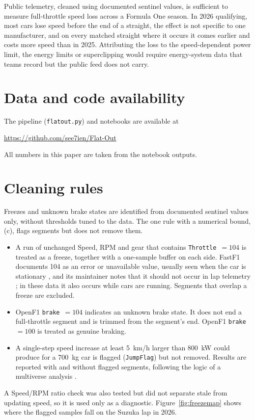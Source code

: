 \documentclass[11pt,a4paper]{article}
\newcommand{\var}[1]{\texttt{#1}}
\begin{document}
Public telemetry, cleaned using documented sentinel values, is sufficient to measure full-throttle speed loss across a Formula One season. In 2026 qualifying, most cars lose speed before the end of a straight, the effect is not specific to one manufacturer, and on every matched straight where it occurs it comes earlier and costs more speed than in 2025. Attributing the loss to the speed-dependent power limit, the energy limits or superclipping would require energy-system data that teams record but the public feed does not carry.

\section*{Data and code availability}
The pipeline (\texttt{flatout.py}) and notebooks are available at
\begin{center}
  \url{https://github.com/see7ien/Flat-Out}
\end{center}
All numbers in this paper are taken from the notebook outputs.

\appendix
\renewcommand{\thefigure}{A\arabic{figure}}
\renewcommand{\theHfigure}{A\arabic{figure}}
\setcounter{figure}{0}
\section{Cleaning rules}
\label{app:cleaning}

Freezes and unknown brake states are identified from documented sentinel values only, without thresholds tuned to the data. The one rule with a numerical bound, (c), flags segments but does not remove them.
\begin{itemize}
  \item[(a)] A run of unchanged Speed, RPM and gear that contains \var{Throttle}~$=104$ is treated as a freeze, together with a one-sample buffer on each side. FastF1 documents 104 as an error or unavailable value, usually seen when the car is stationary \citep{fastf1}, and its maintainer notes that it should not occur in lap telemetry \citep{fastf1issue772}; in these data it also occurs while cars are running. Segments that overlap a freeze are excluded.
  \item[(b)] OpenF1 \var{brake}~$=104$ indicates an unknown brake state. It does not end a full-throttle segment and is trimmed from the segment's end. OpenF1 \var{brake}~$=100$ is treated as genuine braking.
  \item[(c)] A single-step speed increase at least 5~km/h larger than 800~kW could produce for a 700~kg car is flagged (\var{JumpFlag}) but not removed. Results are reported with and without flagged segments, following the logic of a multiverse analysis \citep{steegen2016}.
\end{itemize}
A Speed/RPM ratio check \citep[sec.~6.4]{segers2014} was also tested but did not separate stale from updating speed, so it is used only as a diagnostic. Figure~\ref{fig:freezemap} shows where the flagged samples fall on the Suzuka lap in 2026.
\end{document}
